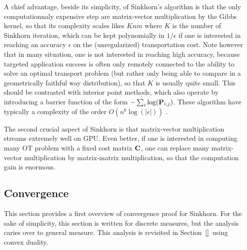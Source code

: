 %

A chief advantage, beside its simplicity, of Sinkhorn's algorithm is that the only computationnaly expensive step are matrix-vector multiplication by the Gibbs kernel, so that its complexity scales likes $Knm$ where $K$ is the number of Sinkhorn iteration, which can be kept polynomially in $1/\epsilon$ if one is interested in reaching an accuracy $\epsilon$ on the (unregularized) transportation cost. Note however that in many situation, one is not interested in reaching high accuracy, because targeted application success is often only remotely connected to the ability to solve an optimal transport problem (but rather only being able to compare in a geometrically faithful way distribution), so that $K$ is usually quite small.
%
This should be contrasted with interior point methods, which also operate by introducing a barrier function of the form $-\sum_i \log(\P_{i,j})$. These algorithm have typically a complexity of the order $O(n^6 \log(|\epsilon|))$ . 

The second crucial aspect of Sinkhorn is that matrix-vector multiplication streams extremely well on GPU. Even better, if one is interested in computing many OT problem with a fixed cost matrix $\C$, one can replace many matrix-vector multiplication by matrix-matrix multiplication, so that the computation gain is enormous. 


\subsection{Convergence}
\label{sec-convergence-init}

This section provides a first overview of convergence proof for Sinkhorn. For the sake of simplicity, this section is written for discrete measures, but the analysis caries over to general measure. This analysis is revisited in Section~\ref{} using convex duality. 

